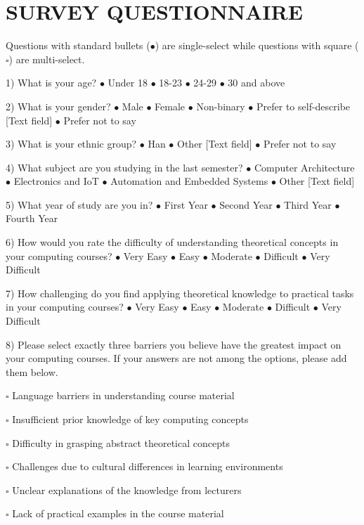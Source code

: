 \documentclass{article}
\begin{document}
\section*{\uppercase{SURVEY QUESTIONNAIRE}}\label{sec:appendix}
Questions with standard bullets ($\bullet$) are single-select while questions
with square ($\square$) are multi-select.

1) What is your age? $\bullet $ Under 18  $\bullet $ 18-23  $\bullet $ 24-29  $\bullet $ 30 and above

2) What is your gender? $\bullet $ Male $\bullet $ Female $\bullet $ Non-binary $\bullet $ Prefer to self-describe [Text field] $\bullet $ Prefer not to say

3) What is your ethnic group? $\bullet $ Han $\bullet $ Other [Text field] $\bullet $ Prefer not to say

4) What subject are you studying in the last semester? $\bullet $ Computer Architecture $\bullet $ Electronics and IoT $\bullet $ Automation and Embedded Systems $\bullet $ Other [Text field]

5) What year of study are you in? $\bullet $ First Year $\bullet $ Second Year $\bullet $ Third Year $\bullet $ Fourth Year

6) How would you rate the difficulty of understanding theoretical concepts in your computing courses?
$\bullet $ Very Easy $\bullet $ Easy $\bullet $ Moderate $\bullet $ Difficult $\bullet $ Very Difficult

7) How challenging do you find applying theoretical knowledge to practical tasks in your computing courses?
$\bullet $ Very Easy $\bullet $ Easy $\bullet $ Moderate $\bullet $ Difficult $\bullet $ Very Difficult

8) Please select exactly three barriers you believe have the greatest impact on your computing courses. If your answers are not among the options, please add them below.

$\square$ Language barriers in understanding course material

$\square$ Insufficient prior knowledge of key computing concepts

$\square$ Difficulty in grasping abstract theoretical concepts

$\square$ Challenges due to cultural differences in learning environments

$\square$ Unclear explanations of the knowledge from lecturers

$\square$ Lack of practical examples in the course material
\end{document}
